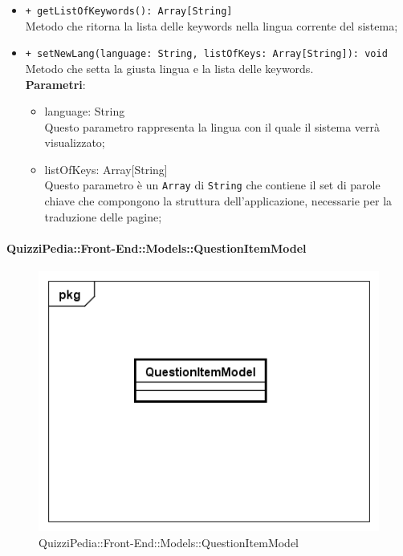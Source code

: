 \begin{itemize}
\begin{itemize}
				\item \texttt{+ getListOfKeywords(): Array[String]} \\
				Metodo che ritorna la lista delle keywords nella lingua corrente del sistema;
				
				\item \texttt{+ setNewLang(language: String, listOfKeys: Array[String]): void} \\
				Metodo che setta la giusta lingua e la lista delle keywords.\\
				\textbf{Parametri}:
				\begin{itemize}
					\item {language: String}\\
					Questo parametro rappresenta la lingua con il quale il sistema verrà visualizzato;
					\item {listOfKeys: Array[String]}\\
					Questo parametro è un \texttt{Array} di \texttt{String} che contiene il set di parole chiave che compongono la struttura dell'applicazione, necessarie per la traduzione delle pagine; 
				\end{itemize}
				
			\end{itemize}
		\end{itemize}
		
		\paragraph{QuizziPedia::Front-End::Models::QuestionItemModel}
		
		\label{QuizziPedia::Front-End::Models::QuestionItemModel}
		
		\begin{figure}[ht]
			\centering
			\includegraphics[scale=0.5,keepaspectratio]{UML/Classi/Front-End/QuizziPedia_Front-end_Models_QuestionItemModel.png}
			\caption{QuizziPedia::Front-End::Models::QuestionItemModel}
		\end{figure} \FloatBarrier
		

